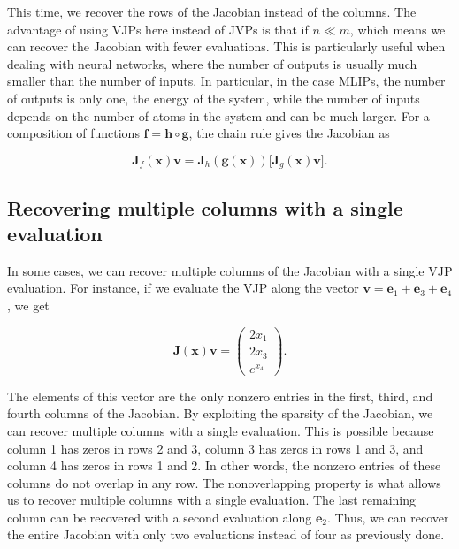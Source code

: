 \documentclass[12pt,a4paper]{article}
\numberwithin{equation}{section}
\begin{document}
This time, we recover the rows of the Jacobian instead of the columns.
The advantage of using VJPs here instead of JVPs is that if $n\ll m$, which means we can recover the Jacobian with fewer evaluations.
This is particularly useful when dealing with neural networks, where the number of outputs is usually much smaller than the number of inputs.
In particular, in the case MLIPs, the number of outputs is only one, the energy of the system,
while the number of inputs depends on the number of atoms in the system and can be much larger.
For a composition of functions $\bm f=\bm h\circ\bm g$, the chain rule gives the Jacobian as

\begin{equation}
  \bm J_f(\bm x)\bm v
  =\bm J_h(\bm g(\bm x))\bigl[\bm J_g(\bm x)\bm v\bigr].
  \label{eq:matrix-free-chain-rule}
\end{equation}

\subsection{Recovering multiple columns with a single evaluation}

In some cases, we can recover multiple columns of the Jacobian with a single VJP evaluation.
For instance, if we evaluate the VJP along the vector $\bm v = \bm e_1+\bm e_3+\bm e_4$, we get

\begin{equation}
  \bm J(\bm x)\bm v
   =\begin{pmatrix}2x_1\\2x_3\\e^{x_4}\end{pmatrix}.
  \label{eq:asd-grouped-example}
\end{equation}

The elements of this vector are the only nonzero entries in the first, third, and fourth columns of the Jacobian.
By exploiting the sparsity of the Jacobian, we can recover multiple columns with a single evaluation.
This is possible because column 1 has zeros in rows 2 and 3, column 3 has zeros in rows 1 and 3, and column 4 has zeros in rows 1 and 2.
In other words, the nonzero entries of these columns do not overlap in any row.
The nonoverlapping property is what allows us to recover multiple columns with a single evaluation.
The last remaining column can be recovered with a second evaluation along $\bm e_2$.
Thus, we can recover the entire Jacobian with only two evaluations instead of four as previously done.
\end{document}
